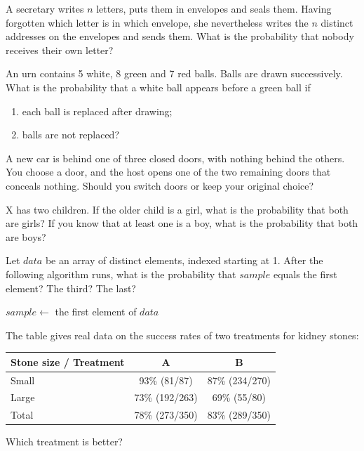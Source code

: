 \documentclass[a4paper]{report}
\begin{document}
\begin{problembook}
A secretary writes $n$ letters, puts them in envelopes and seals them. Having forgotten which letter is in which envelope, she nevertheless writes the $n$ distinct addresses on the envelopes and sends them. What is the probability that nobody receives their own letter?
\end{problembook}
\begin{problem}
An urn contains 5 white, 8 green and 7 red balls. Balls are drawn successively. What is the probability that a white ball appears before a green ball if
\begin{enumerate}\item each ball is replaced after drawing;\item balls are not replaced?\end{enumerate}
\end{problem}
\begin{probleminteresting}
A new car is behind one of three closed doors, with nothing behind the others. You choose a door, and the host opens one of the two remaining doors that conceals nothing. Should you switch doors or keep your original choice?
\end{probleminteresting}
\begin{probleminteresting}
X has two children. If the older child is a girl, what is the probability that both are girls? If you know that at least one is a boy, what is the probability that both are boys?
\end{probleminteresting}
\begin{probleminteresting}
Let $data$ be an array of distinct elements, indexed starting at 1. After the following algorithm runs, what is the probability that $sample$ equals the first element? The third? The last?
\begin{algorithm}[H]
\caption{Reservoir Sampling for 1 Element}
\BlankLine
$sample\gets$ the first element of $data$\;
\end{algorithm}
\end{probleminteresting}
\begin{probleminteresting}
The table gives real data on the success rates of two treatments for kidney stones:
\begin{center}\begin{tabular}{|l|c|c|}\hline
Stone size / Treatment&A&B\\\hline
Small&93\% (81/87)&87\% (234/270)\\\hline
Large&73\% (192/263)&69\% (55/80)\\\hline
Total&78\% (273/350)&83\% (289/350)\\\hline
\end{tabular}\end{center}
Which treatment is better?
\end{probleminteresting}
\end{document}
